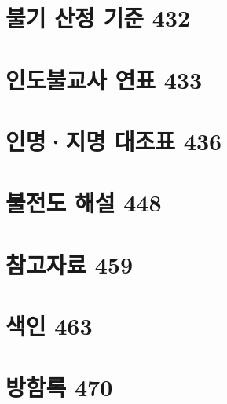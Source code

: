 \documentclass[12pt, a4paper, oneside]{book}
\let\stdsection\section
\renewcommand\section{\newpage\stdsection}
\begin{document}
	\section{불기 산정 기준 432 }

	\section{인도불교사 연표 433 }

	\section{인명·지명 대조표 436 }

	\section{불전도 해설 448 }

	\section{참고자료 459}

	\section{색인 463 }

	\section{방함록 470}


\end{document}
